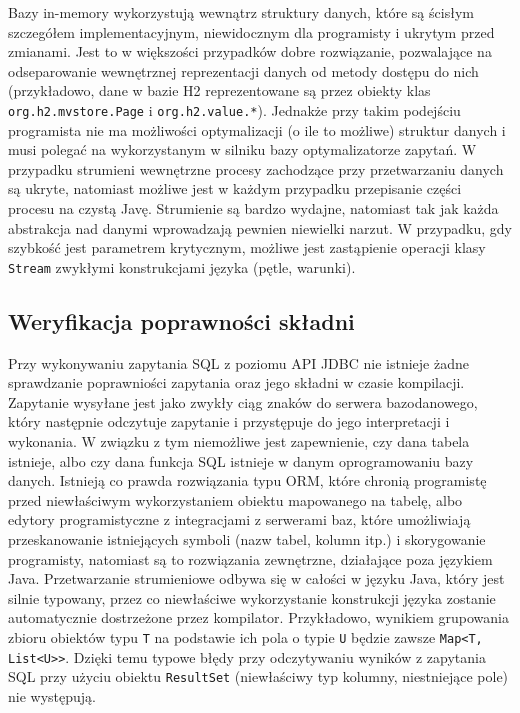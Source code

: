 \documentclass[12pt]{extarticle}
\begin{document}
    Bazy in-memory wykorzystują wewnątrz struktury danych, które są ścisłym szczegółem implementacyjnym, niewidocznym dla programisty i ukrytym przed zmianami. Jest to w większości przypadków dobre rozwiązanie, pozwalające na odseparowanie wewnętrznej reprezentacji danych od metody dostępu do nich (przykładowo, dane w bazie H2 reprezentowane są przez obiekty klas \texttt{org.h2.mvstore.Page} i \texttt{org.h2.value.*}). Jednakże przy takim podejściu programista nie ma możliwości optymalizacji (o ile to możliwe) struktur danych i musi polegać na wykorzystanym w silniku bazy optymalizatorze zapytań. W przypadku strumieni wewnętrzne procesy zachodzące przy przetwarzaniu danych są ukryte, natomiast możliwe jest w każdym przypadku przepisanie części procesu na czystą Javę. Strumienie są bardzo wydajne, natomiast tak jak każda abstrakcja nad danymi wprowadzają pewnien niewielki narzut. W przypadku, gdy szybkość jest parametrem krytycznym, możliwe jest zastąpienie operacji klasy \texttt{Stream} zwykłymi konstrukcjami języka (pętle, warunki). 

\subsection{Weryfikacja poprawności składni}

    Przy wykonywaniu zapytania SQL z poziomu API JDBC nie istnieje żadne sprawdzanie poprawniości zapytania oraz jego składni w czasie kompilacji. Zapytanie wysyłane jest jako zwykły ciąg znaków do serwera bazodanowego, który następnie odczytuje zapytanie i przystępuje do jego interpretacji i wykonania. W związku z tym niemożliwe jest zapewnienie, czy dana tabela istnieje, albo czy dana funkcja SQL istnieje w danym oprogramowaniu bazy danych. Istnieją co prawda rozwiązania typu ORM, które chronią programistę przed niewłaściwym wykorzystaniem obiektu mapowanego na tabelę, albo edytory programistyczne z integracjami z serwerami baz, które umożliwiają przeskanowanie istniejących symboli (nazw tabel, kolumn itp.) i skorygowanie programisty, natomiast są to rozwiązania zewnętrzne, działające poza językiem Java. Przetwarzanie strumieniowe odbywa się w całości w języku Java, który jest silnie typowany, przez co niewłaściwe wykorzystanie konstrukcji języka zostanie automatycznie dostrzeżone przez kompilator. Przykładowo, wynikiem grupowania zbioru obiektów typu \texttt{T} na podstawie ich pola o typie \texttt{U} będzie zawsze \texttt{Map<T, List<U>}\texttt{>}. Dzięki temu typowe błędy przy odczytywaniu wyników z zapytania SQL przy użyciu obiektu \texttt{ResultSet} (niewłaściwy typ kolumny, niestniejące pole) nie występują.
\end{document}
